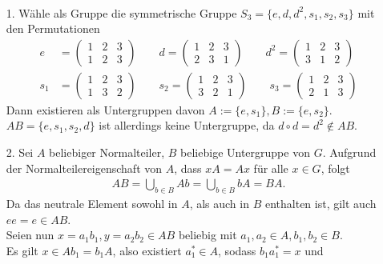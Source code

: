 \begin{solution}
\leavevmode \\
\begin{itemize}
  \item [1.] Wähle als Gruppe die symmetrische Gruppe $S_3 = \{e,d,d^2,s_1,s_2,s_3\}$
  mit den Permutationen
  \begin{align*}
  e &= \begin{pmatrix}
      1 & 2 & 3 \\
      1 & 2 & 3
    \end{pmatrix} \qquad
  d = \begin{pmatrix}
    1 & 2 & 3 \\
    2 & 3 & 1
  \end{pmatrix} \qquad
  d^2 = \begin{pmatrix}
    1 & 2 & 3 \\
    3 & 1 & 2
  \end{pmatrix} \\
  s_1 &= \begin{pmatrix}
    1 & 2 & 3 \\
    1 & 3 & 2
  \end{pmatrix} \qquad
  s_2 = \begin{pmatrix}
    1 & 2 & 3 \\
    3 & 2 & 1
  \end{pmatrix} \qquad
  s_3 = \begin{pmatrix}
    1 & 2 & 3 \\
    2 & 1 & 3
  \end{pmatrix}
  \end{align*}
  Dann existieren als Untergruppen davon $A := \{e,s_1\}, B := \{e,s_2\}$. \\
  $AB = \{e,s_1,s_2, d\}$ ist allerdings keine Untergruppe, da $d \circ d = d^2 \notin AB$.
  \item [2.] Sei $A$ beliebiger Normalteiler, $B$ beliebige Untergruppe von $G$.
  Aufgrund der Normalteilereigenschaft von $A$, dass $xA = Ax$ für alle
  $x \in G$, folgt
  \begin{align*}
    AB = \bigcup_{b \in B}Ab = \bigcup_{b \in B}bA = BA.
  \end{align*}
  Da das neutrale Element sowohl in $A$, als auch in $B$ enthalten ist, gilt auch
  $ee = e \in AB$. \\
  Seien nun $x= a_1b_1, y = a_2b_2 \in AB$ beliebig mit $a_1,a_2 \in A, b_1,b_2 \in B$. \\
  Es gilt $x \in Ab_1 = b_1A$, also existiert $a_1^* \in A$, sodass $b_1a_1^* = x$ und

\end{itemize}
\end{solution}
